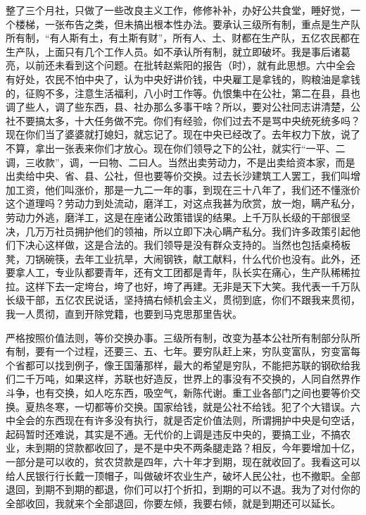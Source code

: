 整了三个月社，只做了一些改良主义工作，修修补补，办好公共食堂，睡好觉，一个楼梯，一张布告之类，但未搞出根本性办法。要承认三级所有制，重点是生产队所有制，“有人斯有土，有土斯有财”，所有人、土、财都在生产队，五亿农民都在生产队，上面只有几个工作人员。如不承认所有制，就立即破坏。我是事后诸葛亮，以前还未看到这个问题。在批转赵紫阳的报告（时），就有此思想。六中全会有好处，农民不怕中央了，认为中央好讲价钱，中央雇工是拿钱的，购粮油是拿钱的，征购不多，注意生活福利，八小时工作等。仇恨集中在公社，第二在县，县也调了些人，调了些东西，县、社办那么多事干啥？所以，要对公社同志讲清楚，公社不要搞太多，十大任务做不完。你们有经验，你们过去不是骂中央统死统多吗？现在你们当了婆婆就打媳妇，就忘记了。现在中央已经改了。去年权力下放，说了不算，拿出一张表来你们才放心。现在你们领导之下的公社，就实行“一平、二调，三收款”，调，一曰物、二曰人。当然出卖劳动力，不是出卖给资本家，而是出卖给中央、省、县、公社，但也要等价交换。过去长沙建筑工人罢工，我们叫增加工资，他们叫涨价，那是一九二一年的事，到现在三十八年了，我们还不懂涨价这个道理吗？劳动力到处流动，磨洋工，对这点我甚为欣赏，放一炮，瞒产私分，劳动力外逃，磨洋工，这是在座诸公政策错误的结果。上千万队长级的干部很坚决，几万万社员拥护他们的领袖，所以立即下决心瞒产私分。我们许多政策引起他们下决心这样做，这是合法的。我们领导是没有群众支持的。当然也包括桌椅板凳，刀锅碗筷，去年工业抗旱，大闹钢铁，献工献料，什么代价也没有。此外，还要拿人工，专业队都要青年，还有文工团都是青年，队长实在痛心，生产队稀稀拉拉。这样下去一定垮台，垮了也好，垮了再建。无非是天下大笑。我代表一千万队长级干部，五亿农民说话，坚持搞右倾机会主义，贯彻到底，你们不跟我来贯彻，我一人贯彻，直到开除党籍，也要到马克思那里告状。

严格按照价值法则，等价交换办事。三级所有制，改变为基本公社所有制部分队所有制，要有一个过程，还要三、五、七年。要穷队赶上来，穷队变富队，穷变富每个省都可以找到例子，像王国藩那样，最大的希望是穷队，不能把苏联的钢砍给我们二千万吨，如果这样，苏联也好造反，世界上的事没有不交换的，人同自然界作斗争，也有交换，如人吃东西，吸空气，新陈代谢。重工业各部门之间也要等价交换。夏热冬寒，一切都等价交换。国家给钱，就是公社不给钱。犯了个大错误。六中全会的东西现在有许多没有执行，就是否定价值法则，所谓拥护中央是句空话，起码暂时还难说，其实是不通。无代价的上调是违反中央的，要搞工业，不搞农业，未到期的贷款都收回了，是不是中央不两条腿走路？相反，今年要增加十亿，一部分是可以收的，贫农贷款是四年，六十年才到期，现在就收回了。我看这可以给人民银行行长戴一顶帽子，叫做破坏农业生产，破坏人民公社，也不撤职。全部退回，到期不到期的都退，你们可以打个折扣，到期的可以不退。我为了对付你的全部收回，我就来个全部退回，你要左倾，我要右倾，就是到期还可以延长。


